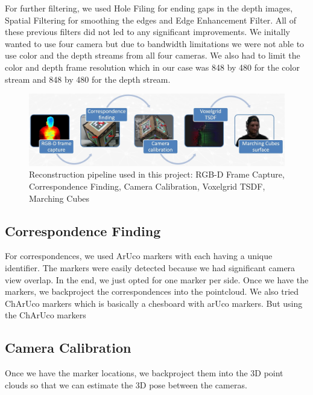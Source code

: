 \documentclass[10pt,twocolumn,letterpaper]{article}
\begin{document}
For further filtering, we used Hole Filing for ending gaps in the depth images, Spatial Filtering for smoothing the edges and Edge Enhancement Filter. All of these previous filters did not led to any significant improvements. We initally wanted to use four camera but due to bandwidth limitations we were not able to use color and the depth streams from all four cameras. We also had to limit the color and depth frame resolution which in our case was 848 by 480 for the color stream and 848 by 480 for the depth stream.

\begin{figure}[t]
\begin{center}
\includegraphics[width=1.0\linewidth]{imgs/pipeline}
\end{center}
 \caption{Reconstruction pipeline used in this project: RGB-D Frame Capture, Correspondence Finding, Camera Calibration, Voxelgrid TSDF, Marching Cubes}
\label{fig:long}
\label{fig:onecol}
\end{figure}
  
\subsection{Correspondence Finding}
For correspondences, we used ArUco markers with each having a unique identifier. The markers were easily detected because we had significant camera view overlap. In the end, we just opted for one marker per side. Once we have the markers, we backproject the correspondences into the pointcloud. We also tried ChArUco markers which is basically a chesboard with arUco markers. But using the ChArUco markers 
\subsection{Camera Calibration}
Once we have the marker locations, we backproject them into the 3D point clouds so that we can estimate the 3D pose between the cameras. 

\end{document}
